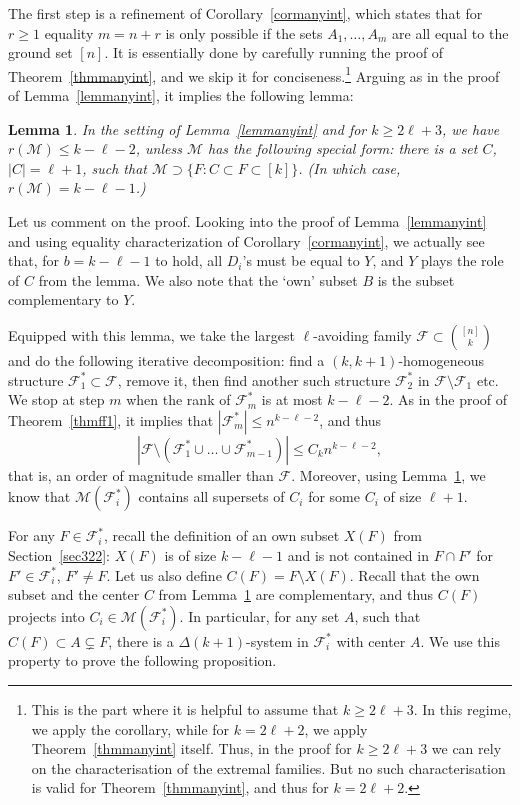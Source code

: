 \documentclass[graybox]{svmult}
\renewcommand{\le}{\leqslant}
\renewcommand{\ge}{\geqslant}
\newcommand{\ff}{\mathcal{F}}
\newtheorem{lem}[thm]{Lemma}
\begin{document}
The first step is a refinement of Corollary~\ref{cormanyint}, which states that for $r\ge 1$ equality $m=n+r$ is only possible if the sets $A_1,\ldots, A_m$ are all equal to the ground set $[n]$. It is essentially done by carefully running the proof of Theorem~\ref{thmmanyint}, and we skip it for conciseness.\footnote{This is the part where it is helpful to assume that $k\ge 2\ell+3$. In this regime, we apply the corollary, while for $k=2\ell+2$, we apply Theorem~\ref{thmmanyint} itself. Thus, in the proof for $k\ge 2\ell+3$ we can rely on the characterisation of the extremal families. But no such characterisation is valid for  Theorem~\ref{thmmanyint}, and thus for $k=2\ell+2$.} Arguing as in the proof of Lemma~\ref{lemmanyint}, it implies the following lemma:

\begin{lem}\label{lemrankref} In the setting of Lemma~\ref{lemmanyint} and for $k\ge 2\ell+3$, we have $r(\mathcal M)\le k-\ell-2$, unless $\mathcal M$ has the following special form: there is a set $C$, $|C| = \ell+1$, such that $\mathcal M\supset \{F: C\subset F \subset [k]\}$. (In which case, $r(\mathcal M) = k-\ell-1$.)
\end{lem}

Let us comment on the proof. Looking into the proof of Lemma~\ref{lemmanyint} and using equality characterization of Corollary~\ref{cormanyint}, we actually see that, for $b=k-\ell-1$ to hold, all $D_i$'s must be equal to $Y$, and $Y$ plays the role of $C$ from the lemma. We also note that the `own' subset $B$ is the subset complementary to $Y$.

Equipped with this lemma, we take the largest $\ell$-avoiding family $\ff\subset {[n]\choose k}$ and do the following iterative decomposition: find a  $(k,k+1)$-homogeneous structure $\ff_1^*\subset \ff$, remove it, then find another such structure $\ff_2^*$ in $\ff\setminus \ff_1$ etc. We stop at step $m$ when the rank of $\ff_m^*$ is at most $k-\ell-2$. As in the proof of Theorem~\ref{thmff1}, it implies that $|\ff_m^*|\le n^{k-\ell-2}$, and thus
\begin{equation}\label{eqrem1}|\ff\setminus (\ff^*_1\cup \ldots\cup \ff^*_{m-1})|\le C_k n^{k-\ell-2},\end{equation}
that is, an order of magnitude smaller than $\ff$. Moreover, using Lemma~\ref{lemrankref}, we know  that $\mathcal M(\ff_i^*)$ contains all supersets of $C_i$ for some $C_i$ of size $\ell+1$.

For any $F\in \ff_i^*$, recall the definition of an own subset $X(F)$ from Section~\ref{sec322}: $X(F)$ is of size $k-\ell-1$ and  is not contained in $F\cap F'$ for $F'\in \ff_i^*$, $F'\ne F$.  Let us also define $C(F) = F\setminus X(F)$. Recall that the own subset and the center $C$ from Lemma~\ref{lemrankref} are complementary, and thus $C(F)$ projects into $C_i\in \mathcal M(\ff_i^*)$. In particular, for any set $A$, such that $C(F)\subset A\subsetneq F$, there is a $\Delta(k+1)$-system in $\ff_i^*$ with center $A$. We use this property to prove the following proposition.
\end{document}
